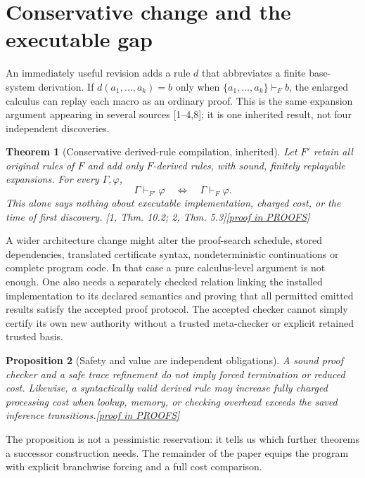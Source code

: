 \documentclass[11pt,letterpaper]{article}
\newtheorem{theorem}{Theorem}[section]
\newtheorem{proposition}[theorem]{Proposition}
\theoremstyle{definition}
\theoremstyle{remark}
\newcommand{\prooflink}[1]{\hfill\hyperlink{proof:#1}{\footnotesize[proof in PROOFS]}}
\newcommand{\src}[1]{\textup{[#1]}}
\begin{document}
\section{Conservative change and the executable gap}
An immediately useful revision adds a rule $d$ that abbreviates a finite base-system derivation. If $d(a_1,\ldots,a_k)=b$ only when $\{a_1,\ldots,a_k\}\vdash_F b$, the enlarged calculus can replay each macro as an ordinary proof. This is the same expansion argument appearing in several sources \src{1--4,8}; it is one inherited result, not four independent discoveries.

\begin{theorem}[Conservative derived-rule compilation, inherited]\label{thm:conservative}\hypertarget{claim:conservative}{}
Let $F'$ retain all original rules of $F$ and add only $F$-derived rules, with sound, finitely replayable expansions. For every $\Gamma,\varphi$, 
\[
 \Gamma\vdash_{F'}\varphi\quad\Longleftrightarrow\quad\Gamma\vdash_F\varphi.
\]
This alone says nothing about executable implementation, charged cost, or the time of first discovery. \src{1, Thm. 10.2; 2, Thm. 5.3}\prooflink{conservative}
\end{theorem}

A wider architecture change might alter the proof-search schedule, stored dependencies, translated certificate syntax, nondeterministic continuations or complete program code. In that case a pure calculus-level argument is not enough. One also needs a separately checked relation linking the installed implementation to its declared semantics and proving that all permitted emitted results satisfy the accepted proof protocol. The accepted checker cannot simply certify its own new authority without a trusted meta-checker or explicit retained trusted basis.

\begin{proposition}[Safety and value are independent obligations]\label{prop:safety}\hypertarget{claim:safety}{}
A sound proof checker and a safe trace refinement do not imply forced termination or reduced cost. Likewise, a syntactically valid derived rule may increase fully charged processing cost when lookup, memory, or checking overhead exceeds the saved inference transitions.\prooflink{safety}
\end{proposition}

The proposition is not a pessimistic reservation: it tells us which further theorems a successor construction needs. The remainder of the paper equips the program with explicit branchwise forcing and a full cost comparison.
\end{document}
